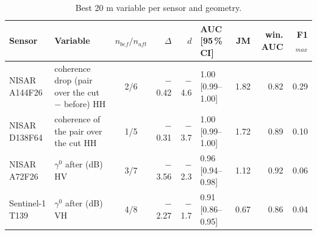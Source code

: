 \begin{table}[htbp]
\centering
\scriptsize
\caption{Best 20 m variable per sensor and geometry.}
\label{tab-best}
\begin{tabular}{llcrrlrrr}
\toprule
Sensor & Variable & $n_{bef}/n_{aft}$ & $\Delta$ & $d$ & AUC [95\,\% CI] & JM & win. AUC & F1$_{max}$ \\
\midrule
NISAR A144F26 & coherence drop (pair over the cut $-$ before) HH & 2/6 & $-$0.42 & $-$4.6 & 1.00 [0.99--1.00] & 1.82 & 0.82 & 0.29 \\
\addlinespace
NISAR D138F64 & coherence of the pair over the cut HH & 1/5 & $-$0.31 & $-$3.7 & 1.00 [0.99--1.00] & 1.72 & 0.89 & 0.10 \\
\addlinespace
NISAR A72F26 & $\gamma^0$ after (dB) HV & 3/7 & $-$3.56 & $-$2.3 & 0.96 [0.94--0.98] & 1.12 & 0.92 & 0.06 \\
\addlinespace
Sentinel-1 T139 & $\gamma^0$ after (dB) VH & 4/8 & $-$2.27 & $-$1.7 & 0.91 [0.86--0.95] & 0.67 & 0.86 & 0.04 \\
\bottomrule
\end{tabular}
\end{table}
